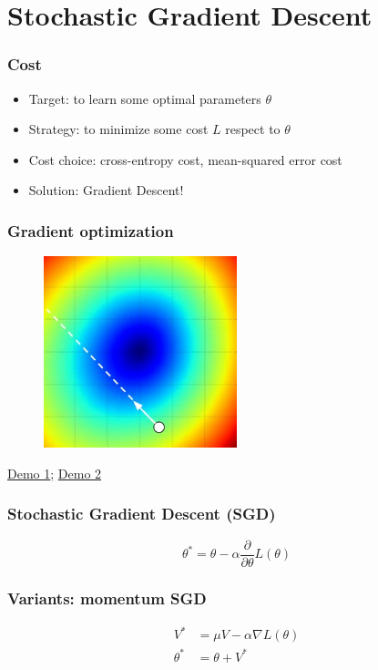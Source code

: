 \documentclass{beamer}
\begin{document}
\section{Stochastic Gradient Descent}

\begin{frame}
  \frametitle{Cost}
  \begin{itemize}
    \item Target: to learn some optimal parameters $\theta$
    \item Strategy: to minimize some cost $L$ respect to $\theta$
    \item Cost choice: cross-entropy cost, mean-squared error cost
    \item Solution: Gradient Descent!
  \end{itemize}
\end{frame}

\begin{frame}
  \frametitle{Gradient optimization}
  \begin{figure}
    \centering
    \includegraphics[width=0.5\textwidth]{stepsize.jpg}
  \end{figure}

  \href{http://rt.dgyblog.com/res/dlworkshop/opt1.gif}{Demo 1}; \href{http://rt.dgyblog.com/res/dlworkshop/opt2.gif}{Demo 2}
\end{frame}

\begin{frame}
  \frametitle{Stochastic Gradient Descent (SGD)}

  \begin{equation*}
    \theta^{*}=\theta-\alpha\frac{\partial}{\partial \theta}L(\theta)
  \end{equation*}
\end{frame}


\begin{frame}
  \frametitle{Variants: momentum SGD}

  \begin{align*}
    V^{*}&=\mu V-\alpha\nabla L(\theta) \\
    \theta^{*}&=\theta+V^{*}
  \end{align*}
\end{frame}
\end{document}
